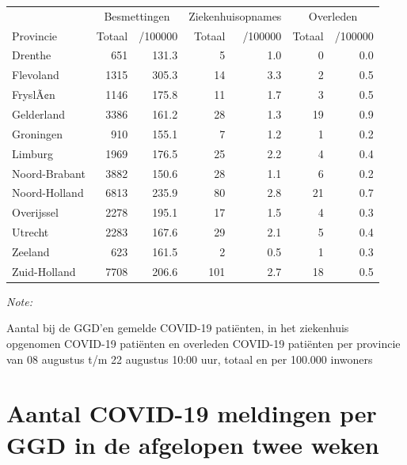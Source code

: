 \documentclass[
  english,
  man,floatsintext]{apa6}
\begin{document}
\begin{table}
\centering
\begin{threeparttable}
\begin{tabular}{lrrrrrr}
\toprule
\multicolumn{1}{c}{ } & \multicolumn{2}{c}{Besmettingen} & \multicolumn{2}{c}{Ziekenhuisopnames} & \multicolumn{2}{c}{Overleden} \\
\cmidrule(l{3pt}r{3pt}){2-3} \cmidrule(l{3pt}r{3pt}){4-5} \cmidrule(l{3pt}r{3pt}){6-7}
Provincie & Totaal & /100000 & Totaal & /100000 & Totaal & /100000\\
\midrule
Drenthe & 651 & 131.3 & 5 & 1.0 & 0 & 0.0\\
Flevoland & 1315 & 305.3 & 14 & 3.3 & 2 & 0.5\\
FryslÃ¢n & 1146 & 175.8 & 11 & 1.7 & 3 & 0.5\\
Gelderland & 3386 & 161.2 & 28 & 1.3 & 19 & 0.9\\
Groningen & 910 & 155.1 & 7 & 1.2 & 1 & 0.2\\
Limburg & 1969 & 176.5 & 25 & 2.2 & 4 & 0.4\\
Noord-Brabant & 3882 & 150.6 & 28 & 1.1 & 6 & 0.2\\
Noord-Holland & 6813 & 235.9 & 80 & 2.8 & 21 & 0.7\\
Overijssel & 2278 & 195.1 & 17 & 1.5 & 4 & 0.3\\
Utrecht & 2283 & 167.6 & 29 & 2.1 & 5 & 0.4\\
Zeeland & 623 & 161.5 & 2 & 0.5 & 1 & 0.3\\
Zuid-Holland & 7708 & 206.6 & 101 & 2.7 & 18 & 0.5\\
\bottomrule
\end{tabular}
\begin{tablenotes}
\item \textit{Note: } 
\item Aantal bij de GGD’en gemelde COVID-19 patiënten, in het ziekenhuis opgenomen COVID-19 patiënten en overleden COVID-19 patiënten per provincie van 08 augustus t/m 22 augustus 10:00 uur, totaal en per 100.000 inwoners
\end{tablenotes}
\end{threeparttable}
\end{table}

\newpage

\hypertarget{aantal-covid-19-meldingen-per-ggd-in-de-afgelopen-twee-weken}{%
\section{Aantal COVID-19 meldingen per GGD in de afgelopen twee weken}\label{aantal-covid-19-meldingen-per-ggd-in-de-afgelopen-twee-weken}}
\end{document}
